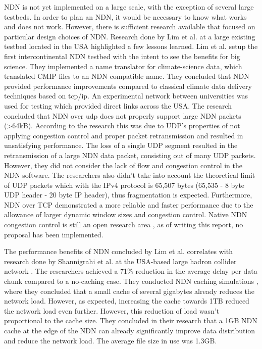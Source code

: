 NDN is not yet implemented on a large scale, with the exception of several large testbeds. In order to plan an NDN, it would be necessary to know what works and does not work. However, there is sufficient research available that focused on particular design choices of NDN. Research done by Lim et al. \cite{lim2018ndn} at a large existing testbed located in the USA \cite{ndn-testbed-status} highlighted a few lessons learned. Lim et al. setup the first intercontinental NDN testbed with the intent to see the benefits for big science. They implemented a name translator for climate-science data, which translated CMIP files to an NDN compatible name. They concluded that NDN provided performance improvements compared to classical climate data delivery techniques based on \gls{tcp}/\gls{ip}. An experimental network between universities was used for testing which provided direct links across the USA. The research concluded that NDN over \gls{udp} does not properly support large NDN packets (\textgreater 64kB). According to the research this was due to UDP's properties of not applying congestion control and proper packet retransmission and resulted in unsatisfying performance. The loss of a single UDP segment resulted in the retransmission of a large NDN data packet, consisting out of many UDP packets. However, they did not consider the lack of flow and congestion control in the NDN software. The researchers also didn't take into account the theoretical limit of UDP packets which with the IPv4 protocol is 65,507 bytes (65,535 - 8 byte UDP header - 20 byte IP header), thus fragmentation is expected. Furthermore, NDN over TCP demonstrated a more reliable and faster performance due to the allowance of larger dynamic window sizes and congestion control. Native NDN congestion control is still an open research area \cite{ren2016congestion}, as of writing this report, no proposal has been implemented.

The performance benefits of NDN concluded by Lim et al. correlates with research done by Shannigrahi et al. at the USA-based large hadron collider network \cite{shannigrahi2015named}. The researchers achieved a 71\% reduction in the average delay per data chunk compared to a no-caching case. They conducted NDN caching simulations \cite{shannigrahi2017request}, where they concluded that a small cache of several gigabytes already reduces the network load. However, as expected, increasing the cache towards 1TB reduced the network load even further. However, this reduction of load wasn't proportional to the cache size. They concluded in their research that a 1GB NDN cache at the edge of the NDN can already significantly improve data distribution and reduce the network load. The average file size in use was 1.3GB.

